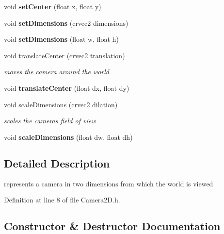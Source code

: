 \begin{DoxyCompactItemize}
void {\bfseries set\+Center} (float x, float y)
\item 
\mbox{\label{classnta_1_1Camera2D_a3b133bef64504b488b04ce18e206544b}} 
void {\bfseries set\+Dimensions} (crvec2 dimensions)
\item 
\mbox{\label{classnta_1_1Camera2D_a253821b9dc464678c80ff92c31a8689f}} 
void {\bfseries set\+Dimensions} (float w, float h)
\item 
\mbox{\label{classnta_1_1Camera2D_a6898ed9fb83d97ede973732d62154967}} 
void \hyperlink{classnta_1_1Camera2D_a6898ed9fb83d97ede973732d62154967}{translate\+Center} (crvec2 translation)
\begin{DoxyCompactList}\small\item\em moves the camera around the world \end{DoxyCompactList}\item 
\mbox{\label{classnta_1_1Camera2D_a78cff35ecd4ea38504283ffb903f92be}} 
void {\bfseries translate\+Center} (float dx, float dy)
\item 
\mbox{\label{classnta_1_1Camera2D_aa89b58a2a5ca0c3df56d07e2722afcd6}} 
void \hyperlink{classnta_1_1Camera2D_aa89b58a2a5ca0c3df56d07e2722afcd6}{scale\+Dimensions} (crvec2 dilation)
\begin{DoxyCompactList}\small\item\em scales the camera\textquotesingle{}s field of view \end{DoxyCompactList}\item 
\mbox{\label{classnta_1_1Camera2D_ae5e80a376fe4b6457e712c6bc94b8584}} 
void {\bfseries scale\+Dimensions} (float dw, float dh)
\end{DoxyCompactItemize}


\subsection{Detailed Description}
represents a camera in two dimensions from which the world is viewed 

Definition at line 8 of file Camera2\+D.\+h.



\subsection{Constructor \& Destructor Documentation}
\mbox{\label{classnta_1_1Camera2D_a11aada3f997c594ade11dd3c46d826f4}} 
